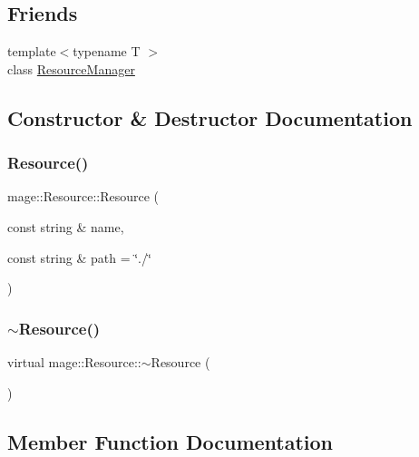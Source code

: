 \subsection*{Friends}
\begin{DoxyCompactItemize}
\item 
{\footnotesize template$<$typename T $>$ }\\class \hyperlink{classmage_1_1_resource_a51a7bf7c13d389aeee09c16059ca41c9}{Resource\+Manager}
\end{DoxyCompactItemize}


\subsection{Constructor \& Destructor Documentation}
\hypertarget{classmage_1_1_resource_a7b4febc86646d51ac116732af01abcaf}{}\label{classmage_1_1_resource_a7b4febc86646d51ac116732af01abcaf} 
\subsubsection{\texorpdfstring{Resource()}{Resource()}}
{\footnotesize\ttfamily mage\+::\+Resource\+::\+Resource (\begin{DoxyParamCaption}\item[{const string \&}]{name,  }\item[{const string \&}]{path = {\ttfamily \char`\"{}./\char`\"{}} }\end{DoxyParamCaption})}

\hypertarget{classmage_1_1_resource_a80112db991a7dfd1dc0b24967981ac60}{}\label{classmage_1_1_resource_a80112db991a7dfd1dc0b24967981ac60} 
\subsubsection{\texorpdfstring{$\sim$\+Resource()}{~Resource()}}
{\footnotesize\ttfamily virtual mage\+::\+Resource\+::$\sim$\+Resource (\begin{DoxyParamCaption}{ }\end{DoxyParamCaption})\hspace{0.3cm}{\ttfamily [virtual]}}



\subsection{Member Function Documentation}
\hypertarget{classmage_1_1_resource_a80b053a65f76bcb61ce9a81478277fc0}{}\label{classmage_1_1_resource_a80b053a65f76bcb61ce9a81478277fc0} 
